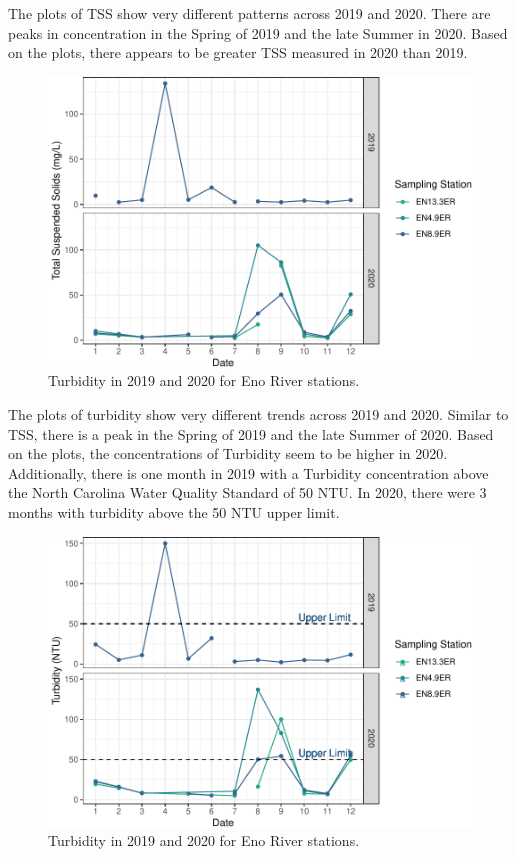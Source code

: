 \documentclass[
  12pt,
]{article}
\begin{document}
The plots of TSS show very different patterns across 2019 and 2020.
There are peaks in concentration in the Spring of 2019 and the late
Summer in 2020. Based on the plots, there appears to be greater TSS
measured in 2020 than 2019.

\begin{figure}
\centering
\includegraphics{August_Lindborg_ENV872_Project_files/figure-latex/unnamed-chunk-10-1.pdf}
\caption{Turbidity in 2019 and 2020 for Eno River stations.}
\end{figure}

The plots of turbidity show very different trends across 2019 and 2020.
Similar to TSS, there is a peak in the Spring of 2019 and the late
Summer of 2020. Based on the plots, the concentrations of Turbidity seem
to be higher in 2020. Additionally, there is one month in 2019 with a
Turbidity concentration above the North Carolina Water Quality Standard
of 50 NTU. In 2020, there were 3 months with turbidity above the 50 NTU
upper limit.

\begin{figure}
\centering
\includegraphics{August_Lindborg_ENV872_Project_files/figure-latex/unnamed-chunk-11-1.pdf}
\caption{Turbidity in 2019 and 2020 for Eno River stations.}
\end{figure}
\end{document}
